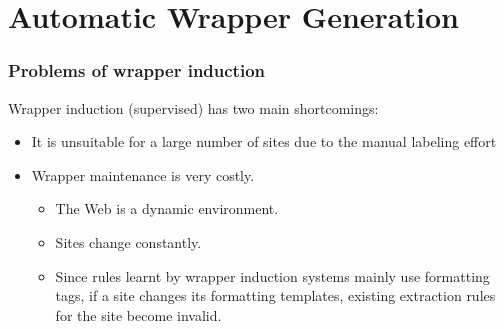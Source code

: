 \documentclass[svgnames]{beamer}
\begin{document}



\section{Automatic Wrapper Generation}

\begin{frame} \frametitle{Problems of wrapper induction}
  
  Wrapper induction (supervised) has two main shortcomings:
  \begin{itemize}
  \item<2-> It is unsuitable for a large number of sites due to the manual labeling
    effort
  \item<3-> Wrapper maintenance is very costly.
    \begin{itemize}
    \item The Web is a dynamic environment.
    \item Sites change constantly.
    \item Since rules learnt by wrapper induction systems mainly use
      formatting tags, if a site changes its formatting templates, existing
      extraction rules for the site become invalid.
    \end{itemize}
  \end{itemize}

\end{frame}
\end{document}
